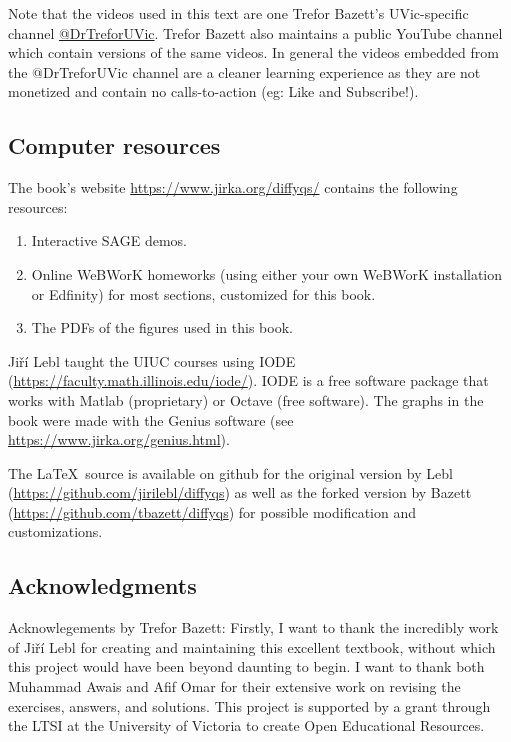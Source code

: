 Note that the videos used in this text are one Trefor Bazett's UVic-specific channel \href{https://youtube.com/@DrTreforUVic}{@DrTreforUVic}. Trefor Bazett also maintains a public YouTube channel which contain versions of the same videos. In general the videos embedded from the @DrTreforUVic channel are a cleaner learning experience as they are not monetized and contain no calls-to-action (eg: Like and Subscribe!). 

\subsection{Computer resources}

The book's
website \url{https://www.jirka.org/diffyqs/}
contains the following resources:
\begin{enumerate}
\item Interactive SAGE demos.
\item Online WeBWorK homeworks
(using either your own WeBWorK installation or Edfinity)
for most sections, customized for this book.
\item The PDFs of the figures used in this book.
\end{enumerate}

Jiří Lebl taught the UIUC courses using IODE
(\url{https://faculty.math.illinois.edu/iode/}).
IODE is a free software package that
works with Matlab (proprietary) or Octave (free software).
The graphs in the book were made with
the Genius software
(see \url{https://www.jirka.org/genius.html}). 

The \LaTeX\ source is available on github for the original version by Lebl (\url{https://github.com/jirilebl/diffyqs}) as well as the forked version by Bazett (\url{https://github.com/tbazett/diffyqs}) for possible modification and customizations.

\subsection{Acknowledgments}



Acknowlegements by Trefor Bazett: Firstly, I want to thank the incredibly work of Ji\v{r}\'i Lebl for creating and maintaining this excellent textbook, without which this project would have been beyond daunting to begin. I want to thank both Muhammad Awais and Afif Omar for their extensive work on revising the exercises, answers, and solutions. This project is supported by a grant through the LTSI at the University of Victoria to create Open Educational Resources. 


